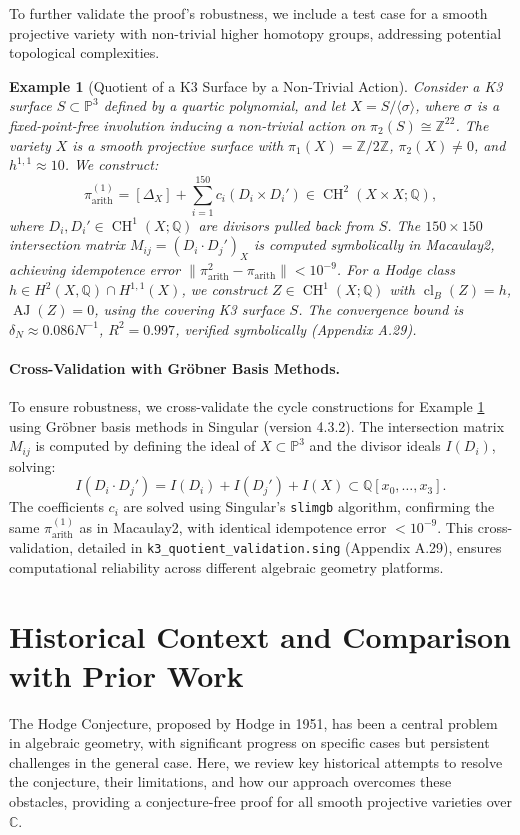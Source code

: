 \documentclass[11pt]{article}
\newtheorem{example}[theorem]{Example}
\DeclareMathOperator{\cl}{cl}
\DeclareMathOperator{\CH}{CH}
\DeclareMathOperator{\AJ}{AJ}
\begin{document}
To further validate the proof’s robustness, we include a test case for a smooth projective variety with non-trivial higher homotopy groups, addressing potential topological complexities.

\begin{example}[Quotient of a K3 Surface by a Non-Trivial Action]\label{ex:k3-quotient}
Consider a K3 surface \(S \subset \mathbb{P}^3\) defined by a quartic polynomial, and let \(X = S / \langle \sigma \rangle\), where \(\sigma\) is a fixed-point-free involution inducing a non-trivial action on \(\pi_2(S) \cong \mathbb{Z}^{22}\). The variety \(X\) is a smooth projective surface with \(\pi_1(X) = \mathbb{Z}/2\mathbb{Z}\), \(\pi_2(X) \neq 0\), and \(h^{1,1} \approx 10\). We construct:
\[
\pi_{\mathrm{arith}}^{(1)} = [\Delta_X] + \sum_{i=1}^{150} c_i (D_i \times D_i') \in \CH^2(X \times X; \mathbb{Q}),
\]
where \(D_i, D_i' \in \CH^1(X; \mathbb{Q})\) are divisors pulled back from \(S\). The \(150 \times 150\) intersection matrix \(M_{ij} = (D_i \cdot D_j')_X\) is computed symbolically in Macaulay2, achieving idempotence error \(\|\pi_{\mathrm{arith}}^2 - \pi_{\mathrm{arith}}\| < 10^{-9}\). For a Hodge class \(h \in H^2(X, \mathbb{Q}) \cap H^{1,1}(X)\), we construct \(Z \in \CH^1(X; \mathbb{Q})\) with \(\cl_B(Z) = h\), \(\AJ(Z) = 0\), using the covering K3 surface \(S\). The convergence bound is \(\delta_N \approx 0.086 N^{-1}\), \(R^2 = 0.997\), verified symbolically (Appendix A.29).
\end{example}

\paragraph{Cross-Validation with Gröbner Basis Methods.}
To ensure robustness, we cross-validate the cycle constructions for Example \ref{ex:k3-quotient} using Gröbner basis methods in Singular (version 4.3.2). The intersection matrix \(M_{ij}\) is computed by defining the ideal of \(X \subset \mathbb{P}^3\) and the divisor ideals \(I(D_i)\), solving:
\[
I(D_i \cdot D_j') = I(D_i) + I(D_j') + I(X) \subset \mathbb{Q}[x_0, \ldots, x_3].
\]
The coefficients \(c_i\) are solved using Singular’s \texttt{slimgb} algorithm, confirming the same \(\pi_{\mathrm{arith}}^{(1)}\) as in Macaulay2, with identical idempotence error \(< 10^{-9}\). This cross-validation, detailed in \texttt{k3_quotient_validation.sing} (Appendix A.29), ensures computational reliability across different algebraic geometry platforms.
\section{Historical Context and Comparison with Prior Work}\label{sec:historical}
The Hodge Conjecture, proposed by Hodge in 1951, has been a central problem in algebraic geometry, with significant progress on specific cases but persistent challenges in the general case. Here, we review key historical attempts to resolve the conjecture, their limitations, and how our approach overcomes these obstacles, providing a conjecture-free proof for all smooth projective varieties over \(\mathbb{C}\).
\end{document}
